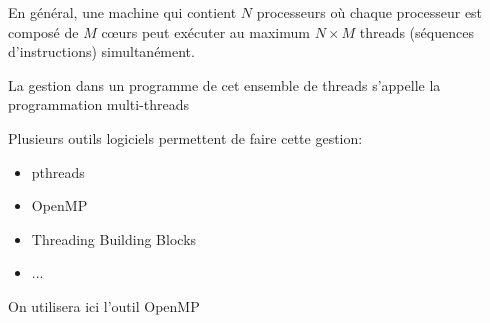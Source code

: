 \documentclass{beamer}
\begin{document}
\begin{frame}
	\vfill
	En g\'en\'eral, une machine qui contient $N$ processeurs o\`u chaque processeur est compos\'e de $M$ c\oe urs peut ex\'ecuter au maximum $N\times M$ threads (s\'equences d'instructions) simultan\'ement.
	
	\vfill
	La gestion dans un programme de cet ensemble de threads s'appelle la programmation multi-threads
	\vfill
	
	Plusieurs outils logiciels permettent de faire cette gestion:
	\begin{itemize}
		\item pthreads
		\item OpenMP
		\item Threading Building Blocks
		\item ...
	\end{itemize}

	\vfill
	On utilisera ici l'outil OpenMP
\end{frame}

\begin{frame}
	\vfill
	\vfill
\end{frame}
\end{document}

